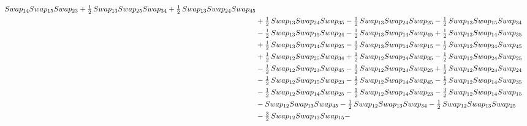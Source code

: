 \documentclass[10pt,a4paper]{amsart}
\begin{document}
\begin{align*}
        \textnormal{Swap}_{14} \textnormal{Swap}_{15} \textnormal{Swap}_{23} + \tfrac12\,\textnormal{Swap}_{13} \textnormal{Swap}_{25} \textnormal{Swap}_{34} + \tfrac12\,\textnormal{Swap}_{13} \textnormal{Swap}_{24} \textnormal{Swap}_{45}\\ & + \tfrac12\,\textnormal{Swap}_{13} \textnormal{Swap}_{24} \textnormal{Swap}_{35} -
        \tfrac12\,\textnormal{Swap}_{13} \textnormal{Swap}_{24} \textnormal{Swap}_{25} - \tfrac12\,\textnormal{Swap}_{13} \textnormal{Swap}_{15} \textnormal{Swap}_{34}\\ & - \tfrac12\,\textnormal{Swap}_{13} \textnormal{Swap}_{15} \textnormal{Swap}_{24} - \tfrac12\,\textnormal{Swap}_{13} \textnormal{Swap}_{14} \textnormal{Swap}_{45} +
        \tfrac12\,\textnormal{Swap}_{13} \textnormal{Swap}_{14} \textnormal{Swap}_{35}\\ & + \tfrac12\,\textnormal{Swap}_{13} \textnormal{Swap}_{14} \textnormal{Swap}_{25} - \tfrac12\,\textnormal{Swap}_{13} \textnormal{Swap}_{14} \textnormal{Swap}_{15} - \tfrac12\,\textnormal{Swap}_{12} \textnormal{Swap}_{34} \textnormal{Swap}_{45}\\ & +
        \tfrac12\,\textnormal{Swap}_{12} \textnormal{Swap}_{25} \textnormal{Swap}_{34} + \tfrac12\,\textnormal{Swap}_{12} \textnormal{Swap}_{24} \textnormal{Swap}_{35} - \tfrac12\,\textnormal{Swap}_{12} \textnormal{Swap}_{24} \textnormal{Swap}_{25}\\ & - \tfrac12\,\textnormal{Swap}_{12} \textnormal{Swap}_{23} \textnormal{Swap}_{45} -
        \tfrac12\,\textnormal{Swap}_{12} \textnormal{Swap}_{23} \textnormal{Swap}_{25} + \tfrac12\,\textnormal{Swap}_{12} \textnormal{Swap}_{23} \textnormal{Swap}_{24}\\ & - \tfrac12\,\textnormal{Swap}_{12} \textnormal{Swap}_{15} \textnormal{Swap}_{23} - \tfrac12\,\textnormal{Swap}_{12} \textnormal{Swap}_{14} \textnormal{Swap}_{45} -
        \tfrac12\,\textnormal{Swap}_{12} \textnormal{Swap}_{14} \textnormal{Swap}_{35}\\ & - \tfrac12\,\textnormal{Swap}_{12} \textnormal{Swap}_{14} \textnormal{Swap}_{25} - \tfrac12\,\textnormal{Swap}_{12} \textnormal{Swap}_{14} \textnormal{Swap}_{23} - \tfrac32\,\textnormal{Swap}_{12} \textnormal{Swap}_{14} \textnormal{Swap}_{15}\\ & -
        \textnormal{Swap}_{12} \textnormal{Swap}_{13} \textnormal{Swap}_{45} - \tfrac12\,\textnormal{Swap}_{12} \textnormal{Swap}_{13} \textnormal{Swap}_{34} - \tfrac12\,\textnormal{Swap}_{12} \textnormal{Swap}_{13} \textnormal{Swap}_{25}\\ & - \tfrac32\,\textnormal{Swap}_{12} \textnormal{Swap}_{13} \textnormal{Swap}_{15} -

\end{align*}
\end{document}
